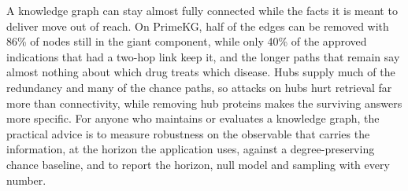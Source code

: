 A knowledge graph can stay almost fully connected while the facts it is meant to
deliver move out of reach. On PrimeKG, half of the edges can be removed with
86\% of nodes still in the giant component, while only 40\% of the approved
indications that had a two-hop link keep it, and the longer paths that remain
say almost nothing about which drug treats which disease. Hubs supply much of
the redundancy and many of the chance paths, so attacks on hubs hurt retrieval
far more than connectivity, while removing hub proteins makes the surviving
answers more specific. For anyone who maintains or evaluates a knowledge graph,
the practical advice is to measure robustness on the observable that carries
the information, at the horizon the application uses, against a
degree-preserving chance baseline, and to report the horizon, null model and
sampling with every number.
